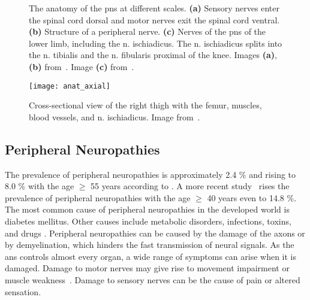 \begin{figure}[htbp]
    \begin{minipage}[c][0.9\textheight][t]{.5\textwidth}
        \centering
        \vspace*{\fill}
        \vfill
    \end{minipage}
    \begin{minipage}[c][0.9\textheight][t]{.5\textwidth}
        \centering
        \vspace*{\fill}
    \end{minipage}
    \vspace*{-0.3cm}
    \caption[Anatomy of the Peripheral Nervous System]{The anatomy of the \gls{pns} at different scales. \textbf{(a)} Sensory nerves enter the spinal cord dorsal and motor nerves exit the spinal cord ventral.
    \textbf{(b)} Structure of a peripheral nerve.
    \textbf{(c)} Nerves of the \gls{pns} of the lower limb, including the \gls{n.} ischiadicus. The \gls{n.} ischiadicus splits into the \gls{n.} tibialis and the \gls{n.} fibularis proximal of the knee.
    Images \textbf{(a)}, \textbf{(b)} from~\cite{Schunke2015THIEMEAnatomy}. Image \textbf{(c)} from~\cite{Schunke2014PrometheusAnatomie}.}
    \label{fig:anat}
\end{figure}

\begin{figure}[htbp]
	\texttt{[image: anat\_axial]}
    \caption[Cross-section of the Right Thigh]{Cross-sectional view of the right thigh with the femur, muscles, blood vessels, and \gls{n.} ischiadicus. Image from~\cite{Schunke2014PrometheusAnatomie}.}
    \label{fig:anat_axial}
\end{figure}

\subsection{Peripheral Neuropathies}
The prevalence of peripheral neuropathies is approximately 2.4 \% and rising to 8.0 \% with the age $\geq$ 55 years according to \cite{Martyn1997EpidemiologyNeuropathy}. A more recent study~\cite{Gregg2004PrevalenceSurvey} rises the prevalence of peripheral neuropathies with the age $\geq$ 40 years even to 14.8 \%. The most common cause of peripheral neuropathies in the developed world is diabetes mellitus. Other causes include metabolic disorders, infections, toxins, and drugs \cite{England2004PeripheralNeuropathy,Hughes466}.
Peripheral neuropathies can be caused by the damage of the axons or by demyelination, which hinders the fast transmission of neural signals. 
As the \gls{ans} controls almost every organ, a wide range of symptoms can arise when it is damaged. Damage to motor nerves may give rise to movement impairment or muscle weakness~\cite{Mohassel2015}. Damage to sensory nerves can be the cause of pain or altered sensation.

